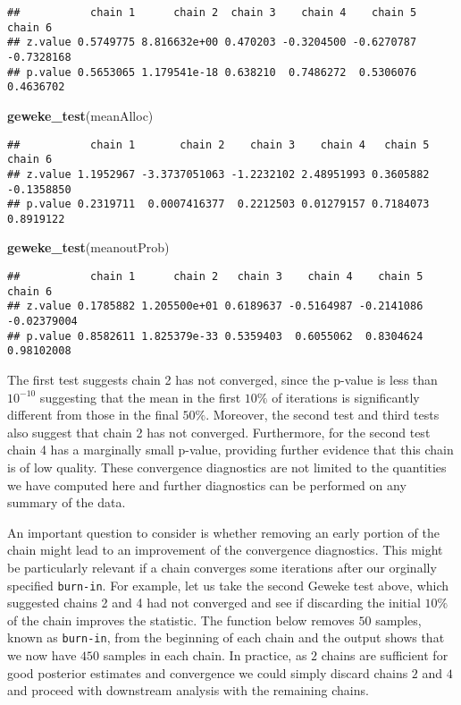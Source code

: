 \documentclass[9pt,a4paper,]{extarticle}
\newenvironment{Shaded}{\begin{snugshade}}{\end{snugshade}}
\newcommand{\KeywordTok}[1]{\textcolor[rgb]{0.13,0.29,0.53}{\textbf{#1}}}
\newcommand{\NormalTok}[1]{#1}
\begin{document}
\begin{verbatim}
##           chain 1      chain 2  chain 3    chain 4    chain 5    chain 6
## z.value 0.5749775 8.816632e+00 0.470203 -0.3204500 -0.6270787 -0.7328168
## p.value 0.5653065 1.179541e-18 0.638210  0.7486272  0.5306076  0.4636702
\end{verbatim}

\begin{Shaded}
\begin{Highlighting}[]
\KeywordTok{geweke_test}\NormalTok{(meanAlloc)}
\end{Highlighting}
\end{Shaded}

\begin{verbatim}
##           chain 1       chain 2    chain 3    chain 4   chain 5    chain 6
## z.value 1.1952967 -3.3737051063 -1.2232102 2.48951993 0.3605882 -0.1358850
## p.value 0.2319711  0.0007416377  0.2212503 0.01279157 0.7184073  0.8919122
\end{verbatim}

\begin{Shaded}
\begin{Highlighting}[]
\KeywordTok{geweke_test}\NormalTok{(meanoutProb)}
\end{Highlighting}
\end{Shaded}

\begin{verbatim}
##           chain 1      chain 2   chain 3    chain 4    chain 5     chain 6
## z.value 0.1785882 1.205500e+01 0.6189637 -0.5164987 -0.2141086 -0.02379004
## p.value 0.8582611 1.825379e-33 0.5359403  0.6055062  0.8304624  0.98102008
\end{verbatim}

The first test suggests chain 2 has not converged, since the p-value is
less than \(10^{-10}\) suggesting that the mean in the first \(10\%\) of
iterations is significantly different from those in the final
\(50\%\). Moreover, the second test and third tests also suggest that chain 2
has not converged. Furthermore, for the second test chain 4 has a marginally
small p-value, providing further evidence that this chain is of low quality. These
convergence diagnostics are not limited to the quantities we have
computed here and further diagnostics can be performed on any summary of
the data.

An important question to consider is whether removing an early portion
of the chain might lead to an improvement of the convergence diagnostics.
This might be particularly relevant if a chain converges some
iterations after our orginally specified \texttt{burn-in}. For example, let us
take the second Geweke test above, which suggested chains 2 and 4 had not
converged and see if discarding the initial \(10\%\) of the chain
improves the statistic. The function below removes \(50\) samples,
known as \texttt{burn-in}, from the beginning of each chain and the
output shows that we now have \(450\) samples in each chain. In practice,
as \(2\) chains are sufficient for good posterior estimates and convergence
we could simply discard chains \(2\) and \(4\) and proceed with downstream analysis
with the remaining chains.
\end{document}
